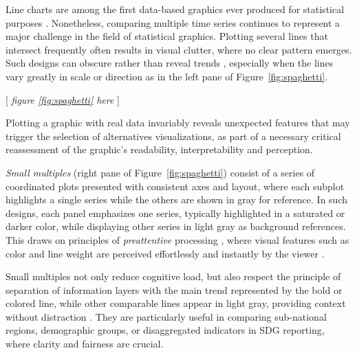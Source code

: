 \documentclass[11pt,twoside,a4paper]{article}
\begin{document}
Line charts are among the first data-based graphics ever produced for statistical purposes \citep{Friendly2008}. Nonetheless, comparing multiple time series continues to represent a major challenge in the field of statistical graphics. Plotting several lines that intersect frequently often results in visual clutter, where no clear pattern emerges. Such designs can obscure rather than reveal trends \citep{Schwabish2014}, especially when the lines vary greatly in scale or direction as in the left pane of Figure~\ref{fig:spaghetti}. 

\begin{center}
    [ \textit{figure \ref{fig:spaghetti}  here}  ]
\end{center}


Plotting a graphic with real data invariably reveals unexpected features that may trigger the selection of alternatives visualizations, as part of a necessary critical reassessment of the graphic's readability, interpretability and perception. 

\emph{Small multiples} (right pane of Figure~\ref{fig:spaghetti})  consist of a series of coordinated plots presented with consistent axes and layout, where each subplot highlights a single series while the others are shown in gray for reference. In such designs, each panel emphasizes one series, typically highlighted in a saturated or darker color,  while displaying other series in light gray as background references. This draws on principles of \textit{preattentive} processing \citep{Treisman1985}, where visual features such as color and line weight are perceived effortlessly and instantly by the viewer \citep{Ware2012}. 

Small multiples not only reduce cognitive load, but also respect the principle of separation of information layers with the main trend represented by the bold or colored line, while other comparable lines appear in light gray, providing context without distraction \citep{Tufte2006}. They are particularly useful in comparing sub-national regions, demographic groups, or disaggregated indicators in SDG reporting, where clarity and fairness are crucial.\\
\end{document}
